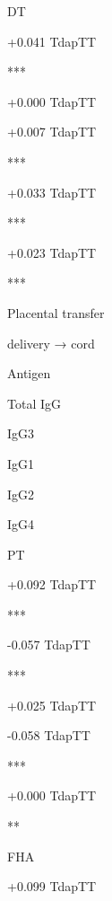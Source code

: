 \documentclass[
]{article}
\begin{document}
DT

{+0.041} {{Tdap}{TT}}

{}{}

{}{}

***

{+0.000} {{Tdap}{TT}}

{}{}

{}{}

{}

{+0.007} {{Tdap}{TT}}

{}{}

{}{}

***

{+0.033} {{Tdap}{TT}}

{}{}

{}{}

***

{+0.023} {{Tdap}{TT}}

{}{}

{}{}

***

Placental transfer

{delivery → cord}

Antigen

Total IgG

IgG3

IgG1

IgG2

IgG4

PT

{+0.092} {{Tdap}{TT}}

{}{}

{}{}

***

{-0.057} {{Tdap}{TT}}

{}{}

{}{}

***

{+0.025} {{Tdap}{TT}}

{}{}

{}{}

{}

{-0.058} {{Tdap}{TT}}

{}{}

{}{}

***

{+0.000} {{Tdap}{TT}}

{}{}

{}{}

**

FHA

{+0.099} {{Tdap}{TT}}

{}{}
\end{document}

